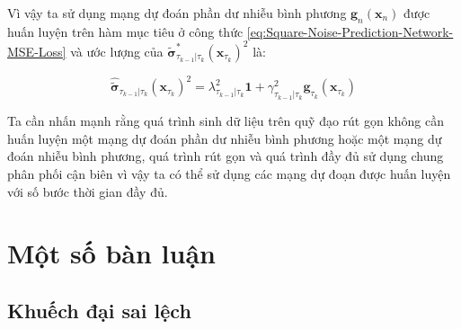 \documentclass[14pt, a4paper]{article}
\numberwithin{equation}{section}
\numberwithin{figure}{section}
\numberwithin{dl}{section}
\numberwithin{md}{section}
\numberwithin{bd}{section}
\numberwithin{dn}{section}
\numberwithin{hq}{section}
\begin{document}
    Vì vậy ta sử dụng mạng dự đoán phần dư nhiễu bình phương $\boldsymbol{g}_n (\boldsymbol{x}_n)$ được huấn luyện trên hàm mục tiêu ở công thức \ref{eq:Square-Noise-Prediction-Network-MSE-Loss} và ước lượng của $\tilde{\boldsymbol{\sigma}}_{\tau_{k-1} \vert \tau_k}^{\ast} (\boldsymbol{x}_{\tau_k})^2$ là:

    \begin{equation}
        \hat{\tilde{\boldsymbol{\sigma}}}_{\tau_{k-1} \vert \tau_k} (\boldsymbol{x}_{\tau_k})^2 = \lambda_{\tau_{k-1} \vert \tau_k}^2 \boldsymbol{1} + \gamma_{\tau_{k-1} \vert \tau_k}^2 \boldsymbol{g}_{\tau_k} (\boldsymbol{x}_{\tau_k})
    \end{equation}

    Ta cần nhấn mạnh rằng quá trình sinh dữ liệu trên quỹ đạo rút gọn không cần huấn luyện một mạng dự đoán phần dư nhiễu bình phương hoặc một mạng dự đoán nhiễu bình phương, quá trình rút gọn và quá trình đầy đủ sử dụng chung phân phối cận biên vì vậy ta có thể sử dụng các mạng dự đoạn được huấn luyện với số bước thời gian đầy đủ.

    \section{Một số bàn luận}

    \subsection{Khuếch đại sai lệch} \label{Appen:Subsection:Error-Amplification}
\end{document}
